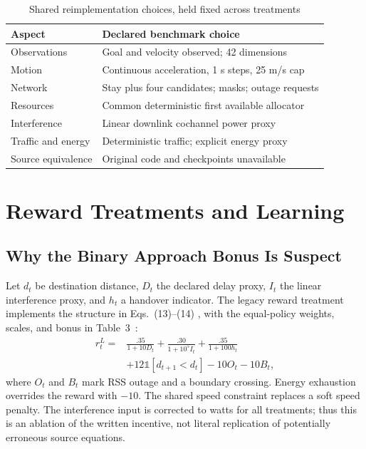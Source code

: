 \documentclass[conference]{IEEEtran}
\newcommand{\ind}{\mathbb{1}}
\begin{document}
\begin{table}[t]
\caption{Shared reimplementation choices, held fixed across treatments}
\label{tab:changes}\centering\footnotesize
\begin{tabular}{@{}p{}p{}@{}}
\toprule
Aspect & Declared benchmark choice\\\midrule
Observations & Goal and velocity observed; 42 dimensions\\
Motion & Continuous acceleration, 1 s steps, 25 m/s cap\\
Network & Stay plus four candidates; masks; outage requests\\
Resources & Common deterministic first available allocator\\
Interference & Linear downlink cochannel power proxy\\
Traffic and energy & Deterministic traffic; explicit energy proxy\\
Source equivalence & Original code and checkpoints unavailable\\\bottomrule
\end{tabular}
\end{table}

\section{Reward Treatments and Learning}
\subsection{Why the Binary Approach Bonus Is Suspect}
Let $d_t$ be destination distance, $D_t$ the declared delay proxy, $I_t$ the
linear interference proxy, and $h_t$ a handover indicator. The legacy reward
treatment implements the structure in Eqs.~(13)--(14)
\cite[p.~12]{thesis}, with the equal-policy weights, scales, and bonus in
Table~3~\cite[p.~15]{thesis}:
\begin{align}
r_t^L={}&\frac{.35}{1+10D_t}+\frac{.30}{1+10^5I_t}
       +\frac{.35}{1+100h_t} \nonumber\\
       &+12\ind[d_{t+1}<d_t]-10O_t-10B_t,
\end{align}
where $O_t$ and $B_t$ mark RSS outage and a boundary crossing. Energy exhaustion
overrides the reward with $-10$. The shared speed constraint replaces a soft
speed penalty. The interference input is corrected to watts for all treatments;
thus this is an ablation of the written incentive, not literal replication of
potentially erroneous source equations.
\end{document}
